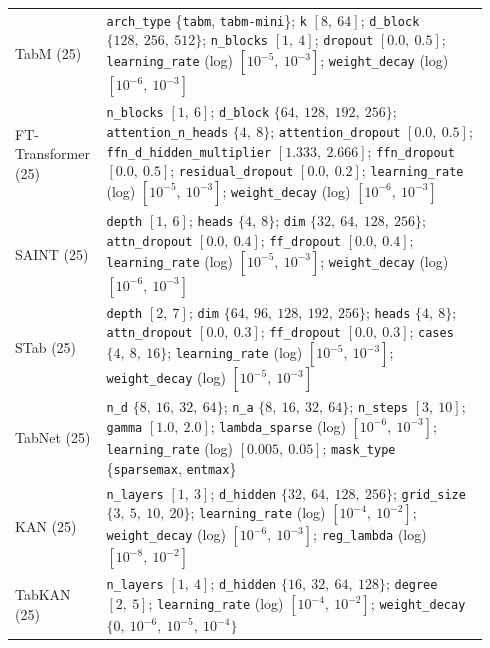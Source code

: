 \begin{table}[htbp]
\begin{tabular}{>{\raggedright\arraybackslash}p{0.16\linewidth}>{\raggedright\arraybackslash}p{0.78\linewidth}}
\addlinespace[2pt]
TabM (25) &
\texttt{arch\_type} \{\texttt{tabm}, \texttt{tabm-mini}\};
\texttt{k} $[8,\ 64]$;
\texttt{d\_block} $\{128,\ 256,\ 512\}$;
\texttt{n\_blocks} $[1,\ 4]$;
\texttt{dropout} $[0.0,\ 0.5]$;
\texttt{learning\_rate} (log) $[10^{-5},\ 10^{-3}]$;
\texttt{weight\_decay} (log) $[10^{-6},\ 10^{-3}]$ \\
\addlinespace[2pt]
FT-Transformer (25) &
\texttt{n\_blocks} $[1,\ 6]$;
\texttt{d\_block} $\{64,\ 128,\ 192,\ 256\}$;
\texttt{attention\_\allowbreak n\_\allowbreak heads} $\{4,\ 8\}$;
\texttt{attention\_\allowbreak dropout} $[0.0,\ 0.5]$;
\texttt{ffn\_\allowbreak d\_\allowbreak hidden\_\allowbreak multiplier}
$[1.333,\ 2.666]$;
\texttt{ffn\_dropout} $[0.0,\ 0.5]$;
\texttt{residual\_\allowbreak dropout} $[0.0,\ 0.2]$;
\texttt{learning\_rate} (log) $[10^{-5},\ 10^{-3}]$;
\texttt{weight\_decay} (log) $[10^{-6},\ 10^{-3}]$ \\
\addlinespace[2pt]
SAINT (25) &
\texttt{depth} $[1,\ 6]$;
\texttt{heads} $\{4,\ 8\}$;
\texttt{dim} $\{32,\ 64,\ 128,\ 256\}$;
\texttt{attn\_dropout} $[0.0,\ 0.4]$;
\texttt{ff\_dropout} $[0.0,\ 0.4]$;
\texttt{learning\_rate} (log) $[10^{-5},\ 10^{-3}]$;
\texttt{weight\_decay} (log) $[10^{-6},\ 10^{-3}]$ \\
\addlinespace[2pt]
STab (25) &
\texttt{depth} $[2,\ 7]$;
\texttt{dim} $\{64,\ 96,\ 128,\ 192,\ 256\}$;
\texttt{heads} $\{4,\ 8\}$;
\texttt{attn\_dropout} $[0.0,\ 0.3]$;
\texttt{ff\_dropout} $[0.0,\ 0.3]$;
\texttt{cases} $\{4,\ 8,\ 16\}$;
\texttt{learning\_rate} (log) $[10^{-5},\ 10^{-3}]$;
\texttt{weight\_decay} (log) $[10^{-5},\ 10^{-3}]$ \\
\addlinespace[2pt]
TabNet (25) &
\texttt{n\_d} $\{8,\ 16,\ 32,\ 64\}$;
\texttt{n\_a} $\{8,\ 16,\ 32,\ 64\}$;
\texttt{n\_steps} $[3,\ 10]$;
\texttt{gamma} $[1.0,\ 2.0]$;
\texttt{lambda\_sparse} (log) $[10^{-6},\ 10^{-3}]$;
\texttt{learning\_rate} (log) $[0.005,\ 0.05]$;
\texttt{mask\_type} \{\texttt{sparsemax}, \texttt{entmax}\} \\
\addlinespace[2pt]
KAN (25) &
\texttt{n\_layers} $[1,\ 3]$;
\texttt{d\_hidden} $\{32,\ 64,\ 128,\ 256\}$;
\texttt{grid\_size} $\{3,\ 5,\ 10,\ 20\}$;
\texttt{learning\_rate} (log) $[10^{-4},\ 10^{-2}]$;
\texttt{weight\_decay} (log) $[10^{-6},\ 10^{-3}]$;
\texttt{reg\_lambda} (log) $[10^{-8},\ 10^{-2}]$ \\
\addlinespace[2pt]
TabKAN (25) &
\texttt{n\_layers} $[1,\ 4]$;
\texttt{d\_hidden} $\{16,\ 32,\ 64,\ 128\}$;
\texttt{degree} $[2,\ 5]$;
\texttt{learning\_rate} (log) $[10^{-4},\ 10^{-2}]$;
\texttt{weight\_decay} $\{0,\ 10^{-6},\ 10^{-5},\ 10^{-4}\}$ \\
\bottomrule
\end{tabular}
\end{table}

